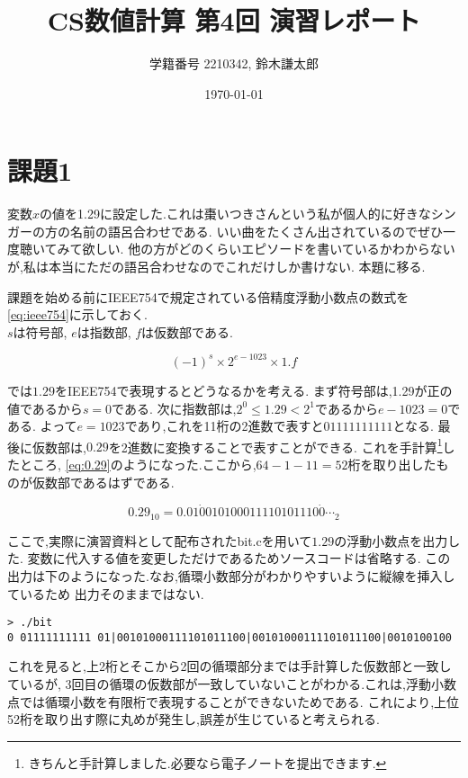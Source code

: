 \documentclass[autodetect-engine, dvi=dvipdfmx, 10pt, a4paper, ja=standard]{bxjsarticle}
\title{CS数値計算 第4回 演習レポート}
\author{学籍番号 2210342, 鈴木謙太郎}
\date{\today}
\begin{document}
\maketitle


\section{課題1}
\label{sec:ex-1}
変数$x$の値を1.29に設定した.これは棗いつきさんという私が個人的に好きなシンガーの方の名前の語呂合わせである.
いい曲をたくさん出されているのでぜひ一度聴いてみて欲しい.
他の方がどのくらいエピソードを書いているかわからないが,私は本当にただの語呂合わせなのでこれだけしか書けない.
本題に移る.

課題を始める前にIEEE754で規定されている倍精度浮動小数点の数式を\ref{eq:ieee754}に示しておく.\\
$s$は符号部, $e$は指数部, $f$は仮数部である.

\begin{equation}
	\label{eq:ieee754}
	(-1)^s \times 2^{e-1023} \times 1.f
\end{equation}

では$1.29$をIEEE754で表現するとどうなるかを考える.
まず符号部は,1.29が正の値であるから$s=0$である.
次に指数部は,$2^0 \leq 1.29 < 2^1$であるから$e - 1023 = 0$である.
よって$e = 1023$であり,これを11桁の2進数で表すと$01111111111$となる.
最後に仮数部は,$0.29$を2進数に変換することで表すことができる.
これを手計算\footnote{きちんと手計算しました.必要なら電子ノートを提出できます.}したところ,
\ref{eq:0.29}のようになった.ここから,$64 - 1 - 11 = 52$桁を取り出したものが仮数部であるはずである.

\begin{equation}
	\label{eq:0.29}
	0.29_{10} = 0.01\dot{0}010100011110101110\dot{0} \cdots_2
\end{equation}

ここで,実際に演習資料として配布されたbit.cを用いて$1.29$の浮動小数点を出力した.
変数に代入する値を変更しただけであるためソースコードは省略する.
この出力は下のようになった.なお,循環小数部分がわかりやすいように縦線を挿入しているため
出力そのままではない.

\begin{verbatim}
> ./bit
0 01111111111 01|00101000111101011100|00101000111101011100|0010100100
\end{verbatim}
\label{verb:bit}

これを見ると,上2桁とそこから2回の循環部分までは手計算した仮数部と一致しているが,
3回目の循環の仮数部が一致していないことがわかる.これは,浮動小数点では循環小数を有限桁で表現することができないためである.
これにより,上位52桁を取り出す際に丸めが発生し,誤差が生じていると考えられる.
\end{document}
